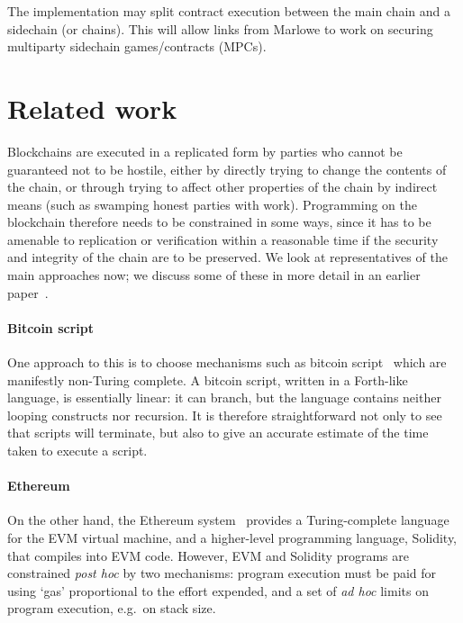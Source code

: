 \documentclass[runningheads]{llncs}
\begin{document}
The implementation may split contract execution between the main chain and a sidechain (or chains). This will allow 
links from Marlowe to work on securing multiparty sidechain games/contracts (MPCs).

\section{Related work}


Blockchains are executed in a replicated form by parties who cannot be guaranteed not to be hostile, either by directly 
trying to change the contents of the chain, or through trying to affect other properties of the chain by indirect means 
(such as swamping honest parties with work). Programming on the blockchain therefore needs to be constrained in some 
ways, since it has to be amenable to replication or verification within a reasonable time if the security and integrity 
of the chain are to be preserved. We look at representatives of the main approaches now; we discuss some of these in more detail in an earlier paper~\cite{cryptoeprint:2016:1156}.

\paragraph{Bitcoin script}

One approach to this is to choose mechanisms such as bitcoin script~\cite{BitcoinWikiScript} which are manifestly 
non-Turing complete. A bitcoin script, written in a Forth-like language, is essentially linear: it can branch, but the 
language contains neither looping constructs nor recursion. It is therefore straightforward not only to see that scripts 
will terminate, but also to give an accurate estimate of the time taken to execute a script. 

\paragraph{Ethereum}

On the other hand, the Ethereum system~\cite{wood2014ethereum} provides a Turing-complete language for the EVM virtual 
machine, and a higher-level programming language, Solidity, that compiles into EVM code. However, EVM and Solidity 
programs are constrained \emph{post hoc} by two mechanisms: program execution must be paid for using `gas' proportional 
to the effort expended, and a set of \emph{ad hoc} limits on program execution, e.g.\ on stack size.
\end{document}
